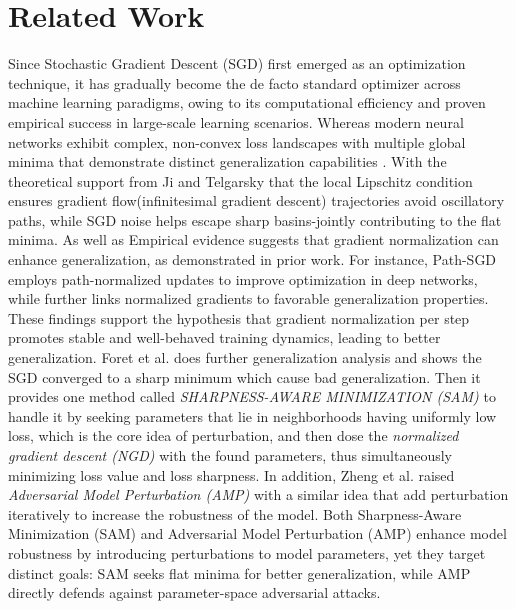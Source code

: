 \documentclass[10pt,twocolumn,letterpaper]{article}
\begin{document}
\section{Related Work}
\label{sec:2}
Since Stochastic Gradient Descent (SGD) \cite{4308316} first emerged as an optimization technique, it has gradually become the de facto standard optimizer across machine learning paradigms, owing to its computational efficiency and proven empirical success in large-scale learning scenarios.
Whereas modern neural networks exhibit complex, non-convex loss landscapes with multiple global minima that demonstrate distinct generalization capabilities \cite{keskar2017largebatchtrainingdeeplearning}. With the theoretical support from Ji and Telgarsky\cite{ji2020directionalconvergencealignmentdeep} that the local Lipschitz condition ensures gradient flow(infinitesimal gradient descent) trajectories avoid oscillatory paths, while SGD noise helps escape sharp basins-jointly contributing to the flat minima. As well as Empirical evidence suggests that gradient normalization can enhance generalization, as demonstrated in prior work. For instance, Path-SGD \cite{neyshabur2015pathsgdpathnormalizedoptimizationdeep} employs path-normalized updates to improve optimization in deep networks, while \cite{jiang2019fantasticgeneralizationmeasures, jastrzebski2020breakevenpointoptimizationtrajectories} further links normalized gradients to favorable generalization properties. These findings support the hypothesis that gradient normalization per step promotes stable and well-behaved training dynamics, leading to better generalization. 
Foret et al.\cite{foret2021sharpnessawareminimizationefficientlyimproving} does further generalization analysis and shows the SGD converged to a sharp minimum which cause bad generalization. Then it provides one method called \textit{SHARPNESS-AWARE MINIMIZATION (SAM)} to handle it by seeking parameters that lie in neighborhoods having uniformly low loss, which is the core idea of perturbation, and then dose the \textit{normalized gradient descent (NGD)} \cite{murray2018revisitingnormalizedgradientdescent} with the found parameters, thus simultaneously minimizing loss value and loss sharpness. In addition, Zheng et al. \cite{zheng2021regularizingneuralnetworksadversarial} raised \textit{Adversarial Model Perturbation (AMP)} with a similar idea that add perturbation iteratively to increase the robustness of the model. Both Sharpness-Aware Minimization (SAM) and Adversarial Model Perturbation (AMP) enhance model robustness by introducing perturbations to model parameters, yet they target distinct goals: SAM seeks flat minima for better generalization, while AMP directly defends against parameter-space adversarial attacks.
\end{document}
